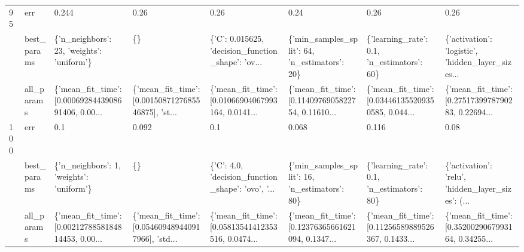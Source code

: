 \begin{tabular}{llllllll}
95  & err &                                              0.244 &                                               0.26 &                                               0.26 &                                               0.24 &                                               0.26 &                                               0.26 \\
    & best\_params &          \{'n\_neighbors': 23, 'weights': 'uniform'\} &                                                 \{\} &  \{'C': 0.015625, 'decision\_function\_shape': 'ov... &      \{'min\_samples\_split': 64, 'n\_estimators': 20\} &         \{'learning\_rate': 0.1, 'n\_estimators': 60\} &  \{'activation': 'logistic', 'hidden\_layer\_sizes... \\
    & all\_params &  \{'mean\_fit\_time': [0.0006928443908691406, 0.00... &  \{'mean\_fit\_time': [0.0015087127685546875], 'st... &  \{'mean\_fit\_time': [0.01066904067993164, 0.0141... &  \{'mean\_fit\_time': [0.1140976905822754, 0.11610... &  \{'mean\_fit\_time': [0.034461355209350585, 0.044... &  \{'mean\_fit\_time': [0.2751739978790283, 0.22694... \\
100 & err &                                                0.1 &                                              0.092 &                                                0.1 &                                              0.068 &                                              0.116 &                                               0.08 \\
    & best\_params &           \{'n\_neighbors': 1, 'weights': 'uniform'\} &                                                 \{\} &  \{'C': 4.0, 'decision\_function\_shape': 'ovo', '... &      \{'min\_samples\_split': 16, 'n\_estimators': 80\} &         \{'learning\_rate': 0.1, 'n\_estimators': 80\} &  \{'activation': 'relu', 'hidden\_layer\_sizes': (... \\
    & all\_params &  \{'mean\_fit\_time': [0.0021278858184814453, 0.00... &  \{'mean\_fit\_time': [0.054609489440917966], 'std... &  \{'mean\_fit\_time': [0.05813541412353516, 0.0474... &  \{'mean\_fit\_time': [0.12376365661621094, 0.1347... &  \{'mean\_fit\_time': [0.11256589889526367, 0.1433... &  \{'mean\_fit\_time': [0.3520029067993164, 0.34255... \\
\bottomrule
\end{tabular}
